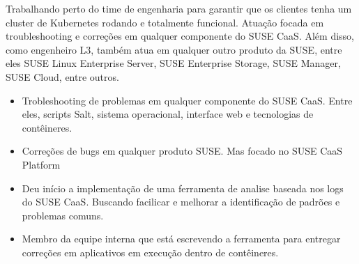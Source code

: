 \documentclass[10pt,a4paper]{altacv}
\begin{document}

\begin{fullwidth}
\makecvheader
\end{fullwidth}


Trabalhando perto do time de engenharia para garantir que os clientes tenha um cluster de Kubernetes rodando e totalmente funcional. Atuação focada em troubleshooting e correções em qualquer componente do SUSE CaaS. Além disso, como engenheiro L3, também atua em qualquer outro produto da SUSE, entre eles SUSE Linux Enterprise Server, SUSE Enterprise Storage, SUSE Manager, SUSE Cloud, entre outros.
\begin{itemize}
\item Trobleshooting de problemas em qualquer componente do SUSE CaaS. Entre eles, scripts Salt, sistema operacional, interface web e tecnologias de contêineres.
\item Correções de bugs em qualquer produto SUSE. Mas focado no SUSE CaaS Platform
\item Deu início a implementação de uma ferramenta de analise baseada nos logs do SUSE CaaS. Buscando facilicar e melhorar a identificação de padrões e problemas comuns.
\item Membro da equipe interna que está escrevendo a ferramenta para entregar correções em aplicativos em execução dentro de contêineres.
\end{itemize}
\end{document}
